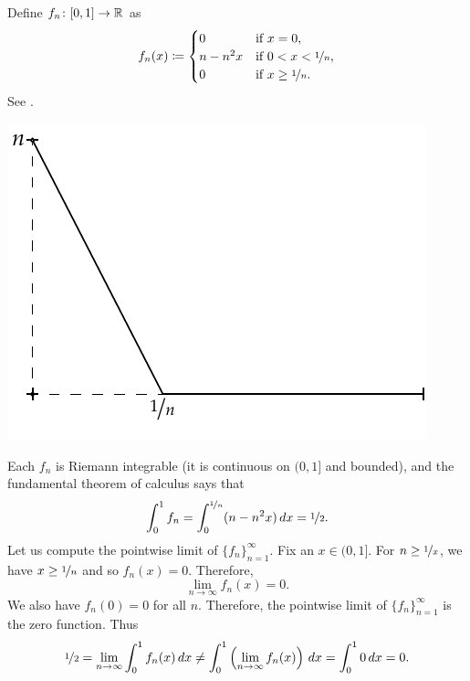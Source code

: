 \begin{example}
Define $f_n \colon [0,1] \to {\mathbb{R}}$ as
\begin{equation*}
f_n(x) \coloneqq
\begin{cases}
0 &  \text{if } x = 0,\\
n-n^2x &  \text{if } 0 < x < \nicefrac{1}{n},\\
0 &  \text{if } x \geq \nicefrac{1}{n}.
\end{cases}
\avoidbreak
\end{equation*}
See .

\begin{myfigureht}
\includegraphics{figures/intconvcntr}
\caption{Graph of $f_n(x)$.%
\label{intconvcntr:fig}}
\end{myfigureht}

Each $f_n$ is Riemann integrable (it is continuous on $(0,1]$ and bounded),
and the fundamental theorem of calculus says that
\begin{equation*}
\int_0^1 f_n =
\int_0^{\nicefrac{1}{n}} (n-n^2x)\,dx = \nicefrac{1}{2} .
\end{equation*}
Let us compute the pointwise limit of $\{ f_n \}_{n=1}^\infty$.
Fix an $x \in (0,1]$.  For $n \geq \nicefrac{1}{x}$,
we have $x \geq \nicefrac{1}{n}$ and so $f_n(x) = 0$.  Therefore,
\begin{equation*}
\lim_{n \to \infty} f_n(x) = 0.
\end{equation*}
We also have $f_n(0) = 0$ for all $n$.  Therefore, the pointwise
limit of $\{ f_n \}_{n=1}^\infty$ is the zero function.  Thus
\begin{equation*}
\nicefrac{1}{2} =
\lim_{n\to\infty}
\int_0^1 f_n (x)\,dx
\not=
\int_0^1
\left(
\lim_{n\to\infty}
f_n(x)\right)\,dx
=
\int_0^1 0\,dx = 0 .
\end{equation*}
\end{example}

